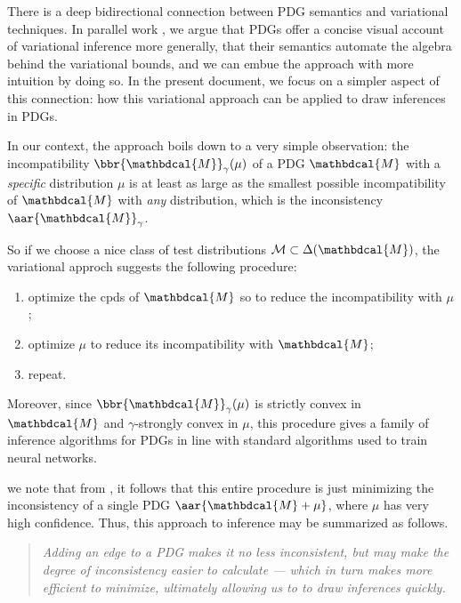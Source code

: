 \documentclass{article}
\theoremstyle{plain}
\theoremstyle{definition}
\theoremstyle{remark}
\newcommand{\dg}[1]{\mathbdcal{#1}}
\newcommand{\bundle}{\mathbin{+}}
\begin{document}
There is a deep bidirectional connection between PDG semantics and variational techniques.
In parallel work \cite{PDG:universal_loss}, we argue that PDGs offer a concise visual account of variational inference more generally, that their semantics automate the algebra behind the variational bounds, and we can embue the approach with more intuition by doing so.
In the present document, we focus on a simpler aspect of this connection: how this variational approach can be applied to draw inferences in PDGs.

In our context, the approach boils down to a very simple observation: the incompatibility $\bbr{\dg M}_\gamma(\mu)$ of a PDG $\dg M$ with a \emph{specific} distribution $\mu$ is at least as large as the smallest possible incompatibility of $\dg M$ with \emph{any} distribution, which is the inconsistency $\aar{\dg M}_\gamma$.

So if we choose a nice class of test distributions $\mathcal M \subset \Delta(\dg M)$, the variational approch suggests the following procedure:
\begin{center}
	\begin{enumerate}[nosep]
		\item optimize the cpds of $\dg M$ so to reduce the incompatibility with $\mu$;
		\item optimize $\mu$ to reduce its incompatibility with $\dg M$;
		\item repeat.
	\end{enumerate}
\end{center}

Moreover, since $\bbr{\dg M}_\gamma(\mu)$ is strictly convex in $\dg M$ and $\gamma$-strongly convex in $\mu$, this procedure gives a family of inference algorithms for PDGs in line with standard algorithms used to train neural networks.

 we note that from , it follows that this entire procedure is just minimizing the inconsistency of a single PDG $\aar{\dg M \bundle \mu}$, where $\mu$ has very high confidence.
Thus, this approach to inference may be summarized as follows.

\begin{quotation} \it
	\noindent Adding an edge to a PDG makes it no less inconsistent, but may make the degree of inconsistency easier to calculate --- which in turn makes more efficient to minimize, ultimately allowing us to to draw inferences quickly.
\end{quotation}
\end{document}
